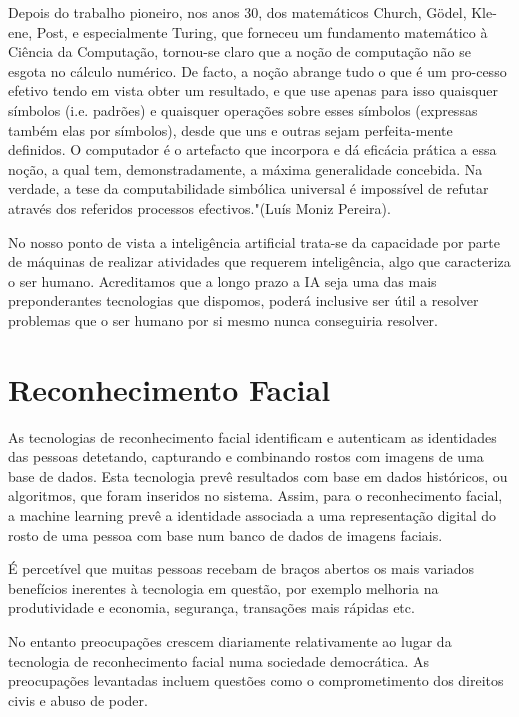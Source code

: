 \documentclass{article}
\begin{document}
Depois do trabalho pioneiro, nos anos 30, dos matemáticos Church, Gödel, Kle- ene, Post, e especialmente Turing, que forneceu um fundamento matemático à Ciência da Computação, tornou-se claro que a noção de computação não se esgota no cálculo numérico. De facto, a noção abrange tudo o que é um pro-cesso efetivo tendo em vista obter um resultado, e que use apenas para isso quaisquer símbolos (i.e. padrões) e quaisquer operações sobre esses símbolos (expressas também elas por símbolos), desde que uns e outras sejam perfeita-mente definidos. O computador é o artefacto que incorpora e dá eficácia prática a essa noção, a qual tem, demonstradamente, a máxima generalidade concebida. Na verdade, a tese da computabilidade simbólica universal é impossível de refutar através dos referidos processos efectivos."(Luís Moniz Pereira).

No nosso ponto de vista a inteligência artificial trata-se da capacidade por parte de máquinas de realizar atividades que requerem inteligência, algo que caracteriza o ser humano. Acreditamos que a longo prazo a IA seja uma das mais preponderantes tecnologias que dispomos, poderá inclusive ser útil a resolver problemas que o ser humano por si mesmo nunca conseguiria resolver.\cite{g} 

  

\section{Reconhecimento Facial} 

As tecnologias de reconhecimento facial identificam e autenticam as identidades das pessoas detetando, capturando e combinando rostos com imagens de uma base de dados. Esta tecnologia prevê resultados com base em dados históricos, ou algoritmos, que foram inseridos no sistema. Assim, para o reconhecimento facial, a machine learning prevê a identidade associada a uma representação digital do rosto de uma pessoa com base num banco de dados de imagens faciais. 

É percetível que muitas pessoas recebam de braços abertos os mais variados benefícios inerentes à tecnologia em questão, por exemplo melhoria na produtividade e economia, segurança, transações mais rápidas etc. 

No entanto preocupações crescem diariamente relativamente ao lugar da tecnologia de reconhecimento facial numa sociedade democrática. As preocupações levantadas incluem questões como o comprometimento dos direitos civis e abuso de poder. \cite{a} \cite{b} \cite{d} \cite{e}
\end{document}
